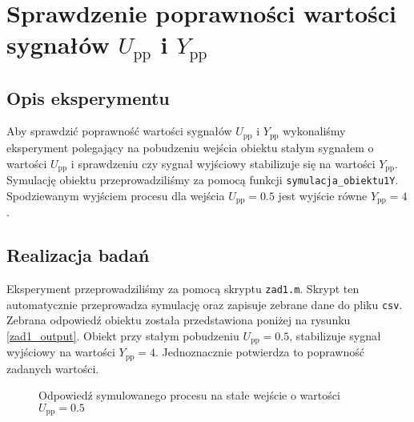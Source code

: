 \chapter{Sprawdzenie poprawności wartości sygnałów $U_{\mathrm{pp}}$ i $Y_{\mathrm{pp}}$}
\label{zad1}

\section{Opis eksperymentu}
\label{zad1_opis}
Aby sprawdzić poprawność wartości sygnałów $U_{\mathrm{pp}}$ i $Y_{\mathrm{pp}}$ wykonaliśmy eksperyment polegający na
pobudzeniu wejścia obiektu stałym sygnałem o wartości $U_{\mathrm{pp}}$ i sprawdzeniu czy sygnał wyjściowy stabilizuje 
się na wartości $Y_{\mathrm{pp}}$. Symulację obiektu przeprowadziliśmy za pomocą funkcji 
\verb+symulacja_obiektu1Y+. Spodziewanym wyjściem procesu dla wejścia $U_{\mathrm{pp}} = \num{0.5}$ jest
wyjście równe $Y_{\mathrm{pp}} = \num{4}$.

\section{Realizacja badań}
\label{zad_realizacja}
Eksperyment przeprowadziliśmy za pomocą skryptu \verb+zad1.m+. Skrypt ten automatycznie przeprowadza symulację 
oraz zapisuje zebrane dane do pliku \verb+csv+. Zebrana odpowiedź obiektu została przedstawiona poniżej na rysunku \ref{zad1_output}. 
Obiekt przy stałym pobudzeniu $U_{\mathrm{pp}}=\num{0.5}$, stabilizuje sygnał wyjściowy na wartości $Y_{\mathrm{pp}}=\num{4}$.
Jednoznacznie potwierdza to poprawność zadanych wartości.

\begin{figure}[b]
    \label{zad1_output_sprawdzenie}
    \centering
    \caption{Odpowiedź symulowanego procesu na stałe wejście o wartości $U_{\mathrm{pp}}=\num{0.5}$}
\end{figure}